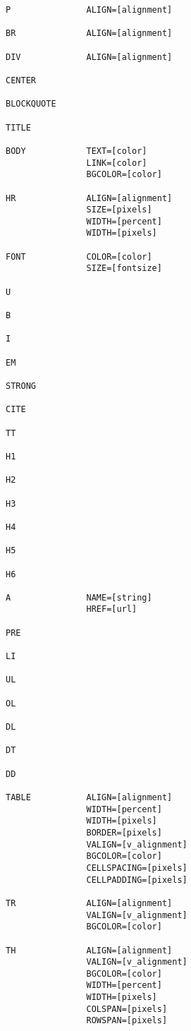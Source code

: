 \begin{verbatim}
P               ALIGN=[alignment]

BR              ALIGN=[alignment]

DIV             ALIGN=[alignment]

CENTER

BLOCKQUOTE

TITLE

BODY            TEXT=[color]
                LINK=[color]
                BGCOLOR=[color]
                
HR              ALIGN=[alignment]
                SIZE=[pixels]
                WIDTH=[percent]
                WIDTH=[pixels]
                
FONT            COLOR=[color]
                SIZE=[fontsize]
                
U

B

I

EM

STRONG

CITE

TT

H1

H2

H3

H4

H5

H6

A               NAME=[string]
                HREF=[url]

PRE

LI

UL

OL

DL

DT

DD

TABLE           ALIGN=[alignment]
                WIDTH=[percent]
                WIDTH=[pixels]
                BORDER=[pixels]
                VALIGN=[v_alignment]
                BGCOLOR=[color]
                CELLSPACING=[pixels]
                CELLPADDING=[pixels]

TR              ALIGN=[alignment]
                VALIGN=[v_alignment]
                BGCOLOR=[color]
                
TH              ALIGN=[alignment]
                VALIGN=[v_alignment]
                BGCOLOR=[color]
                WIDTH=[percent]
                WIDTH=[pixels]
                COLSPAN=[pixels]
                ROWSPAN=[pixels]
                

\end{verbatim}

